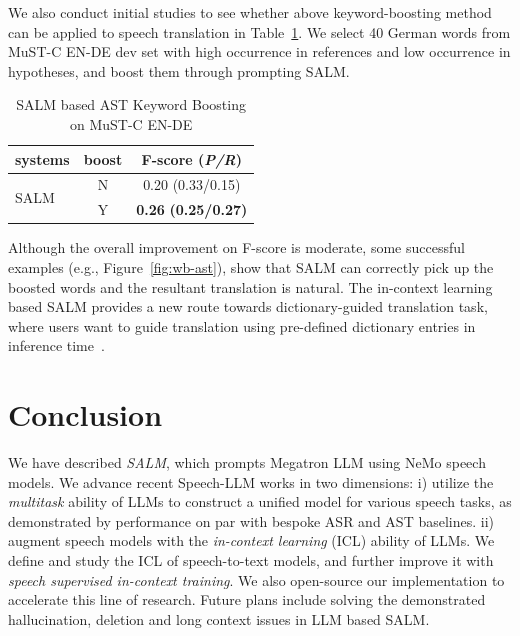 \documentclass{article}
\begin{document}
We also conduct  initial studies to see whether above keyword-boosting method can be applied to speech translation in Table~\ref{tab:exp-wb-ast}. We select  40 German words from MuST-C EN-DE dev set with high occurrence in references and low occurrence in hypotheses, and boost them through prompting SALM. 


\begin{table}[]
\centering
\vspace{-1em}
\caption{\label{tab:exp-wb-ast} {SALM based AST Keyword Boosting on MuST-C {\footnotesize EN-DE}} }
\begin{tabular}{lcc}
\toprule
systems                               & boost     & F-score ({\em P/R}) \\
\midrule
\multirow{2}{*}{SALM}& N             & 0.20 (0.33/0.15)      \\
                                    & Y             &\textbf{ 0.26} \textbf{(0.25/0.27) }    \\
            \bottomrule
\end{tabular}
\vspace{-1.2em}
\end{table}



Although the overall improvement on F-score is moderate, some successful examples (e.g., Figure~\ref{fig:wb-ast}), show that SALM can correctly pick up the boosted words and the resultant translation is natural. The in-context learning based SALM provides a new route towards  dictionary-guided translation task, where  users want
to guide translation using pre-defined dictionary entries in  inference time~\cite{alkhouli2018alignment}.


\vspace{-0.5em}
\section{Conclusion}
\label{sec:conclude}
\vspace{-0.4em}
We have described {\em SALM}, which
prompts Megatron LLM\cite{shoeybi2019megatron} using NeMo\cite{kuchaiev2019nemo} speech models. We advance  recent Speech-LLM works in two dimensions:  i) utilize the {\em multitask} ability of LLMs to construct a unified model for various speech tasks, as demonstrated by performance on par with bespoke ASR and AST baselines.
 ii) augment speech models with the {\em in-context learning} (ICL) ability of LLMs. We define and study  the ICL of speech-to-text models, and further improve it with {\em speech supervised in-context training}.
We also open-source our implementation to accelerate this line of research.
Future plans include solving the demonstrated hallucination, deletion and long context issues in LLM based SALM.  
\end{document}
